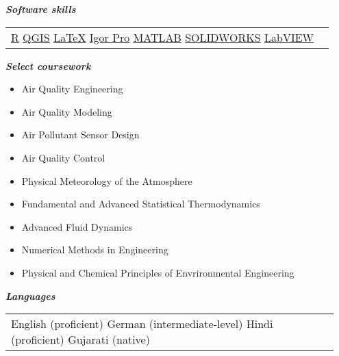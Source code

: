 \documentclass{article}
\begin{document}
\hrulefill
\textit{\textbf{  Software skills  }}
\hrulefill
\vspace{-3mm}
\begin{center}
\begin{tabular}{p{0.97\linewidth}}
\\[-2ex]
\href{https://www.r-project.org/}{R}
\hfill
\href{https://www.qgis.org/en/site/about/index.html}{QGIS}
\hfill
\href{http://www.latex-project.org/}{\LaTeX}
\hfill
\href{https://www.wavemetrics.com/products/igorpro}{Igor Pro}
\hfill
\href{http://www.mathworks.com/products/matlab/}{MATLAB}
\hfill
\href{http://www.solidworks.com/}{SOLIDWORKS}
\hfill
\href{http://www.ni.com/labview/}{LabVIEW}
\end{tabular}
\end{center}
\vspace{1mm}

\hrulefill
\textit{\textbf{  Select coursework  }}
\hrulefill
\vspace{-2.5mm}
\begin{multicols}{3}
\begin{itemize}
\item Air Quality Engineering
\item Air Quality Modeling
\item Air Pollutant Sensor Design
\item Air Quality Control
\item Physical Meteorology of the \newline \vspace{-1ex} Atmosphere
\item Fundamental and Advanced Statistical Thermodynamics
\item Advanced Fluid Dynamics
\item Numerical Methods in \newline \vspace{-1ex}Engineering
\item Physical and Chemical \newline \vspace{-1ex}Principles of Envrironmental Engineering
\end{itemize}
\end{multicols}

\hrulefill
\textit{\textbf{  Languages  }}
\hrulefill
\vspace{-2mm}
\begin{center}
\begin{tabular}{p{0.95\linewidth}}
English (proficient)
\hfill
German (intermediate-level)
\hfill
Hindi (proficient)
\hfill
Gujarati (native)
\end{tabular}
\end{center}
\vspace{1mm}
\end{document}
